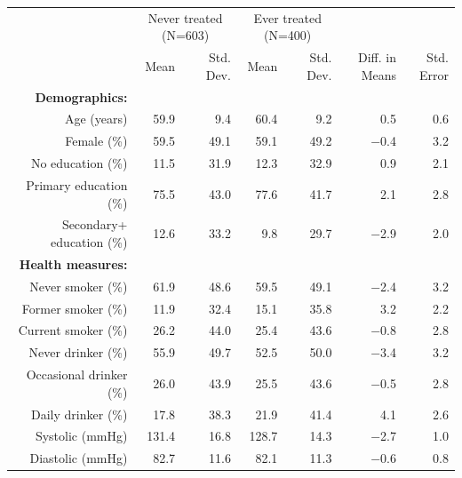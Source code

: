 \documentclass[
  letterpaper,
  DIV=11,
  numbers=noendperiod]{scrartcl}
\makeatletter
\renewenvironment{table}%
   {\renewcommand\familydefault\sfdefault
    \@float{table}}
   {\end@float}
\makeatother
\begin{document}
\begin{table}
\centering\centering
\caption{\label{tab:table1}Title}
\centering
\fontsize{9}{11}\selectfont
\begin{tabular}[t]{rrrrrrr}
\toprule
\multicolumn{1}{c}{ } & \multicolumn{2}{c}{Never treated (N=603)} & \multicolumn{2}{c}{Ever treated (N=400)} & \multicolumn{2}{c}{ } \\
\cmidrule(l{3pt}r{3pt}){2-3} \cmidrule(l{3pt}r{3pt}){4-5}
  & Mean & Std. Dev. & Mean & Std. Dev. & Diff. in Means & Std. Error\\
\midrule
\textbf{Demographics:} & \textbf{} & \textbf{} & \textbf{} & \textbf{} & \textbf{} & \textbf{}\\
Age (years) & \num{59.9} & \num{9.4} & \num{60.4} & \num{9.2} & \num{0.5} & \num{0.6}\\
Female (\%) & \num{59.5} & \num{49.1} & \num{59.1} & \num{49.2} & \num{-0.4} & \num{3.2}\\
No education (\%) & \num{11.5} & \num{31.9} & \num{12.3} & \num{32.9} & \num{0.9} & \num{2.1}\\
Primary education (\%) & \num{75.5} & \num{43.0} & \num{77.6} & \num{41.7} & \num{2.1} & \num{2.8}\\
Secondary+ education (\%) & \num{12.6} & \num{33.2} & \num{9.8} & \num{29.7} & \num{-2.9} & \num{2.0}\\
\textbf{Health measures:} & \textbf{} & \textbf{} & \textbf{} & \textbf{} & \textbf{} & \textbf{}\\
Never smoker (\%) & \num{61.9} & \num{48.6} & \num{59.5} & \num{49.1} & \num{-2.4} & \num{3.2}\\
Former smoker (\%) & \num{11.9} & \num{32.4} & \num{15.1} & \num{35.8} & \num{3.2} & \num{2.2}\\
Current smoker (\%) & \num{26.2} & \num{44.0} & \num{25.4} & \num{43.6} & \num{-0.8} & \num{2.8}\\
Never drinker (\%) & \num{55.9} & \num{49.7} & \num{52.5} & \num{50.0} & \num{-3.4} & \num{3.2}\\
Occasional drinker (\%) & \num{26.0} & \num{43.9} & \num{25.5} & \num{43.6} & \num{-0.5} & \num{2.8}\\
Daily drinker (\%) & \num{17.8} & \num{38.3} & \num{21.9} & \num{41.4} & \num{4.1} & \num{2.6}\\
Systolic (mmHg) & \num{131.4} & \num{16.8} & \num{128.7} & \num{14.3} & \num{-2.7} & \num{1.0}\\
Diastolic (mmHg) & \num{82.7} & \num{11.6} & \num{82.1} & \num{11.3} & \num{-0.6} & \num{0.8}\\

\end{tabular}
\end{table}
\end{document}
